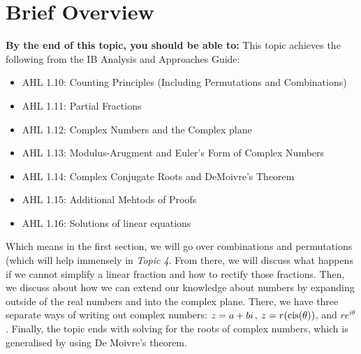 \documentclass[../main.tex]{subfiles}
\begin{document}
\newcommand{\iu}{{i\mkern1mu}}
\chapter*{Brief Overview}
\vspace{1em}
\textbf{By the end of this topic, you should be able to:}
This topic achieves the following from the IB Analysis and Approaches Guide:
\begin{itemize}
    \setlength\itemsep{0em}
    \item AHL 1.10: Counting Principles (Including Permutations and Combinations)
    \item AHL 1.11: Partial Fractions
    \item AHL 1.12: Complex Numbers and the Complex plane
    \item AHL 1.13: Modulus-Arugment and Euler's Form of Complex Numbers
    \item AHL 1.14: Complex Conjugate Roots and DeMoivre's Theorem
    \item AHL 1.15: Additional Mehtods of Proofs
    \item AHL 1.16: Solutions of linear equations
\end{itemize}
    Which means in the first section, we will go over combinations and permutations (which will help immensely in \textsl{Topic 4}. From there, we will discuss what happens if we cannot simplify a linear fraction and how to rectify those fractions. Then, we discuss about how we can extend our knowledge about numbers by expanding outside of the real numbers and into the complex plane. There, we have three separate ways of writing out complex numbers: $z=a+b\iu$, $z=r(\operatorname{cis}(\theta))$, and $re^{i\theta}$. Finally, the topic ends with solving for the roots of complex numbers, which is generalised by using De Moivre's theorem.
\vspace{1em}
\newpage
\end{document}
